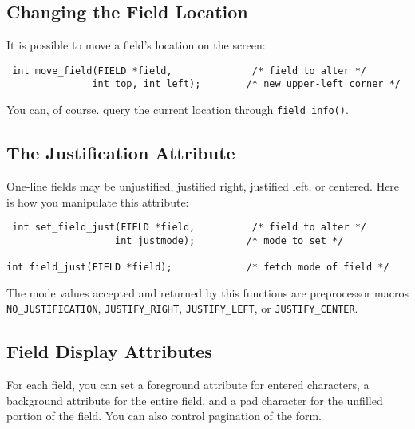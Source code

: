 \subsection{Changing the Field Location}

\label{f0:flocation}It is possible to move a field's location on the screen:
\begin{verbatim} int move_field(FIELD *field,              /* field to alter */
               int top, int left);        /* new upper-left corner */
\end{verbatim}
You can, of course. query the current location through \texttt{field\_info()}.

\subsection{The Justification Attribute}

\label{f0:fjust}One-line fields may be unjustified, justified right, justified left,
or centered.  Here is how you manipulate this attribute:
\begin{verbatim} int set_field_just(FIELD *field,          /* field to alter */
                   int justmode);         /* mode to set */

int field_just(FIELD *field);             /* fetch mode of field */
\end{verbatim}
The mode values accepted and returned by this functions are
preprocessor macros \texttt{NO\_JUSTIFICATION}, \texttt{JUSTIFY\_RIGHT},
\texttt{JUSTIFY\_LEFT}, or \texttt{JUSTIFY\_CENTER}.

\subsection{Field Display Attributes}

\label{f0:fdispatts}For each field, you can set a foreground attribute for entered
characters, a background attribute for the entire field, and a pad
character for the unfilled portion of the field.  You can also
control pagination of the form. 

